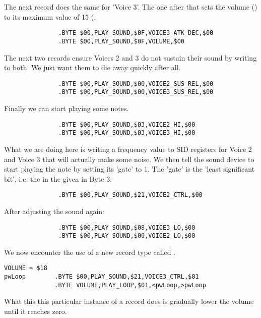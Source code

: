 The next record does the same for 'Voice 3'. The one after that sets the volume () to its maximum value of 15 (.
\begin{lstlisting}
               .BYTE $00,PLAY_SOUND,$0F,VOICE3_ATK_DEC,$00
               .BYTE $00,PLAY_SOUND,$0F,VOLUME,$00
\end{lstlisting}

The next two records ensure Voices 2 and 3 do not sustain their sound by writing  to both. We just want them to die
away quickly after all.
\begin{lstlisting}
               .BYTE $00,PLAY_SOUND,$00,VOICE2_SUS_REL,$00
               .BYTE $00,PLAY_SOUND,$00,VOICE3_SUS_REL,$00
\end{lstlisting}

Finally we can start playing some notes.
\begin{lstlisting}
               .BYTE $00,PLAY_SOUND,$03,VOICE2_HI,$00
               .BYTE $00,PLAY_SOUND,$03,VOICE3_HI,$00
\end{lstlisting}

What we are doing here is writing a frequency value to SID registers for Voice 2 and Voice 3 that will actually make some noise.
We then tell the sound device to start playing the note by setting its 'gate' to 1. The 'gate' is the 'least significant bit', i.e.
the  in the  given in Byte 3:

\begin{lstlisting}
               .BYTE $00,PLAY_SOUND,$21,VOICE2_CTRL,$00
\end{lstlisting}

After adjusting the sound again:


\begin{lstlisting}
               .BYTE $00,PLAY_SOUND,$08,VOICE3_LO,$00
               .BYTE $00,PLAY_SOUND,$00,VOICE2_LO,$00
\end{lstlisting}

We now encounter the use of a new record type called . 

\begin{lstlisting}
VOLUME = $18
pwLoop        .BYTE $00,PLAY_SOUND,$21,VOICE3_CTRL,$01
              .BYTE VOLUME,PLAY_LOOP,$01,<pwLoop,>pwLoop
\end{lstlisting}

What this this particular instance of a  record does is gradually lower the volume until it reaches zero.

